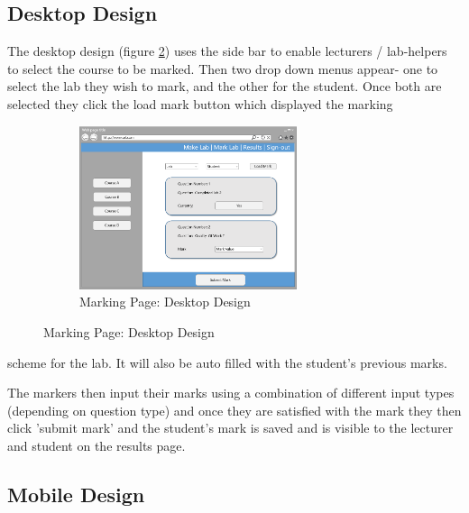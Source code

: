 \documentclass[11pt]{report}
\begin{document}
\subsection*{Desktop Design}

The desktop design (figure \ref{fig:design-marking-pc}) uses the side bar to enable lecturers / lab-helpers to select the course to be marked. Then two drop down menus appear- one to select the lab they wish to mark,  and the other for the student. Once both are selected they click the load mark button which displayed the marking

\begin{figure}
\vspace*{-\baselineskip}
\begin{figure}[H]
    \centering
    \includegraphics[width=0.7\textwidth]{images/design/marking-desktop.png}
    \caption{Marking Page: Desktop Design}
    \label{fig:design-marking-pc}
\end{figure}
\end{figure}

\noindent   scheme for the lab. It will also be auto filled with the student's previous marks.

The markers then input their marks using a combination of different input types (depending on question type) and once they are satisfied with the mark they then click 'submit mark' and the student's mark is saved and is visible to the lecturer and student on the results page.


\subsection*{Mobile Design}
\end{document}
